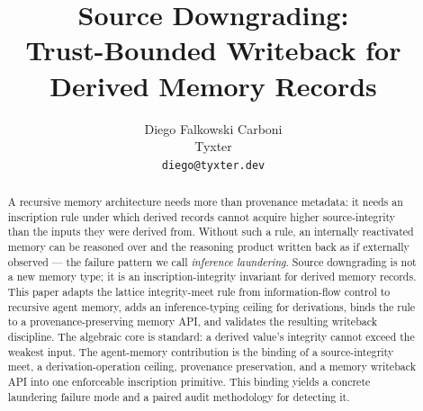 \documentclass[11pt]{article}
\title{Source Downgrading:\\
Trust-Bounded Writeback for\\Derived Memory Records}
\author{Diego Falkowski Carboni\\Tyxter\\\texttt{diego@tyxter.dev}}
\date{}
\begin{document}
\maketitle

\begin{abstract}
A recursive memory architecture needs more than provenance metadata: it needs an inscription rule under which derived records cannot acquire higher source-integrity than the inputs they were derived from. Without such a rule, an internally reactivated memory can be reasoned over and the reasoning product written back as if externally observed --- the failure pattern we call \emph{inference laundering}. Source downgrading is not a new memory type; it is an inscription-integrity invariant for derived memory records. This paper adapts the lattice integrity-meet rule from information-flow control \cite{Denning1976,MyersLiskov1997,SabelfeldMyers2003} to recursive agent memory, adds an inference-typing ceiling for derivations, binds the rule to a provenance-preserving memory API, and validates the resulting writeback discipline. The algebraic core is standard: a derived value's integrity cannot exceed the weakest input. The agent-memory contribution is the binding of a source-integrity meet, a derivation-operation ceiling, provenance preservation, and a memory writeback API into one enforceable inscription primitive. This binding yields a concrete laundering failure mode and a paired audit methodology for detecting it.


\end{abstract}
\end{document}
